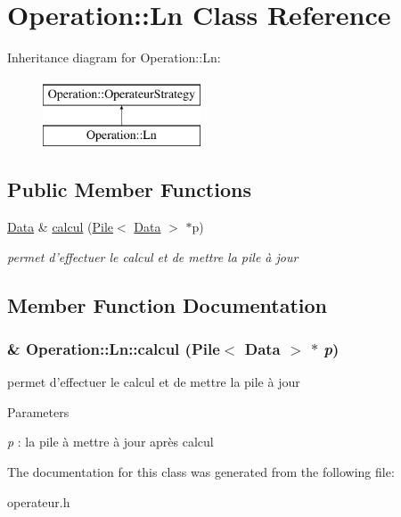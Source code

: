 \hypertarget{classOperation_1_1Ln}{
\section{Operation::Ln Class Reference}
\label{classOperation_1_1Ln}
}
Inheritance diagram for Operation::Ln:\begin{figure}[H]
\begin{center}
\leavevmode
\includegraphics[height=2cm]{classOperation_1_1Ln}
\end{center}
\end{figure}
\subsection*{Public Member Functions}
\begin{DoxyCompactItemize}
\item 
\hyperlink{classNombre_1_1Data}{Data} \& \hyperlink{classOperation_1_1Ln_a8bc00baed99977f01c07cdb86cb40e75}{calcul} (\hyperlink{classPile}{Pile}$<$ \hyperlink{classNombre_1_1Data}{Data} $>$ $\ast$p)
\begin{DoxyCompactList}\small\item\em permet d'effectuer le calcul et de mettre la pile à jour \item\end{DoxyCompactList}\end{DoxyCompactItemize}


\subsection{Member Function Documentation}
\hypertarget{classOperation_1_1Ln_a8bc00baed99977f01c07cdb86cb40e75}{
\subsubsection[{calcul}]{\& Operation::Ln::calcul ({\bf Pile}$<$ {\bf Data} $>$ $\ast$ {\em p})}}
\label{classOperation_1_1Ln_a8bc00baed99977f01c07cdb86cb40e75}


permet d'effectuer le calcul et de mettre la pile à jour 


\begin{DoxyParams}{Parameters}
\item[{\em p}]: la pile à mettre à jour après calcul \end{DoxyParams}


The documentation for this class was generated from the following file:\begin{DoxyCompactItemize}
\item 
operateur.h\end{DoxyCompactItemize}
